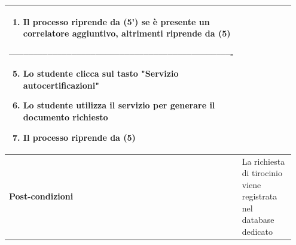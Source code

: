 \documentclass[12pt]{article}
\begin{document}
\begin{longtable}{|p{0.35\linewidth} | p{0.6\linewidth}|}
\begin{enumerate}[label=(\arabic*')]
      \item Il processo riprende da (5') se è presente un correlatore aggiuntivo, altrimenti riprende da (5)
   \end{enumerate}
   ––––––––––––––––––––––––––––––––––––––––––––––-
   \begin{enumerate}[label=(\arabic*')]
      \setcounter{enumi}{4}
      \item Lo studente clicca sul tasto "Servizio autocertificazioni"
      \item Lo studente utilizza il servizio per generare il documento richiesto
      \item Il processo riprende da (5)
   \end{enumerate}
   \\ \hline
   \textbf{Post-condizioni} & La richiesta di tirocinio viene registrata nel database dedicato \\ \hline
 \end{longtable}
\end{document}
